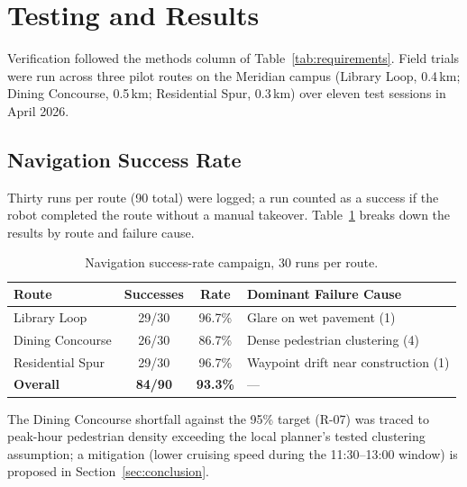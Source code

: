 \section{Testing and Results}
\label{sec:testing}

Verification followed the methods column of Table~\ref{tab:requirements}.
Field trials were run across three pilot routes on the Meridian campus
(Library Loop, 0.4\,km; Dining Concourse, 0.5\,km; Residential Spur,
0.3\,km) over eleven test sessions in April 2026.

\subsection{Navigation Success Rate}
Thirty runs per route (90 total) were logged; a run counted as a success if
the robot completed the route without a manual takeover. Table~\ref{tab:nav}
breaks down the results by route and failure cause.

\begin{table}[htbp]
\centering
\caption{Navigation success-rate campaign, 30 runs per route.}
\label{tab:nav}
\small
\begin{tabular}{@{}lccl@{}}
\toprule
\textbf{Route} & \textbf{Successes} & \textbf{Rate} & \textbf{Dominant Failure Cause} \\
\midrule
Library Loop        & 29/30 & 96.7\% & Glare on wet pavement (1) \\
Dining Concourse     & 26/30 & 86.7\% & Dense pedestrian clustering (4) \\
Residential Spur    & 29/30 & 96.7\% & Waypoint drift near construction (1) \\
\midrule
\textbf{Overall}    & \textbf{84/90} & \textbf{93.3\%} & --- \\
\bottomrule
\end{tabular}
\end{table}

The Dining Concourse shortfall against the 95\% target (R-07) was traced to
peak-hour pedestrian density exceeding the local planner's tested clustering
assumption; a mitigation (lower cruising speed during the 11:30--13:00
window) is proposed in Section~\ref{sec:conclusion}.

